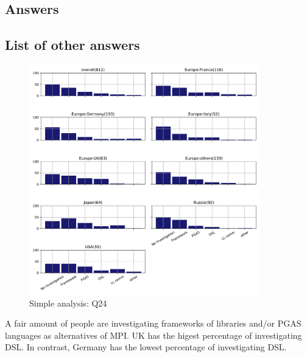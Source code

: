 
\subsection{Answers}



\subsection{List of other answers}
\begin{itemize}

\end{itemize}

\begin{figure}[htb]
\begin{center}
\includegraphics[width=10cm]{../pdfs/Q24.pdf}
\caption{Simple analysis: Q24}
\label{fig:Q24}
\end{center}
\end{figure}

A fair amount of people are investigating frameworks of libraries
and/or PGAS languages as alternatives of MPI.  UK has the higest
percentage of investigating DSL. In contrast, Germany has the lowest
percentage of investigating DSL. 
